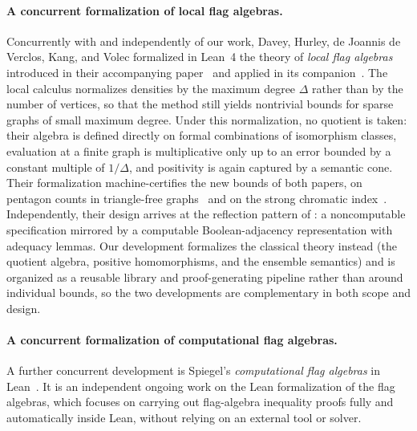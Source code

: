 \documentclass{article}
\begin{document}
\paragraph{A concurrent formalization of local flag algebras.}
Concurrently with and independently of our work, Davey, Hurley, de Joannis
de Verclos, Kang, and Volec formalized in Lean~4 the theory of \emph{local
flag algebras} introduced in their accompanying paper~\cite{davey2026local}
and applied in its companion~\cite{davey2026strong}.
The local calculus normalizes densities by the maximum degree $\Delta$
rather than by the number of vertices, so that the method still yields
nontrivial bounds for sparse graphs of small maximum degree.  Under this
normalization, no quotient is taken: their algebra is defined directly on
formal combinations of isomorphism classes, evaluation at a finite graph is
multiplicative only up to an error bounded by a constant multiple of
$1/\Delta$, and positivity is again captured by a semantic cone.  Their formalization
machine-certifies the new bounds of both papers, on pentagon counts in
triangle-free graphs~\cite{davey2026local} and on the strong chromatic
index~\cite{davey2026strong}.  Independently,
their design arrives at the reflection pattern of : a
noncomputable specification mirrored by a computable Boolean-adjacency
representation with adequacy lemmas.  Our development formalizes the
classical theory instead (the quotient algebra, positive homomorphisms,
and the ensemble semantics) and is organized as a reusable library and
proof-generating pipeline rather than around individual bounds, so the two
developments are complementary in both scope and design.

\paragraph{A concurrent formalization of computational flag algebras.}
A further concurrent development is Spiegel's \emph{computational flag
algebras} in Lean~\cite{spiegel2026computational}.  It is an independent
ongoing work on the Lean formalization of the flag algebras, which focuses
on carrying out flag-algebra inequality proofs fully and automatically
inside Lean, without relying on an external tool or solver.
\end{document}
